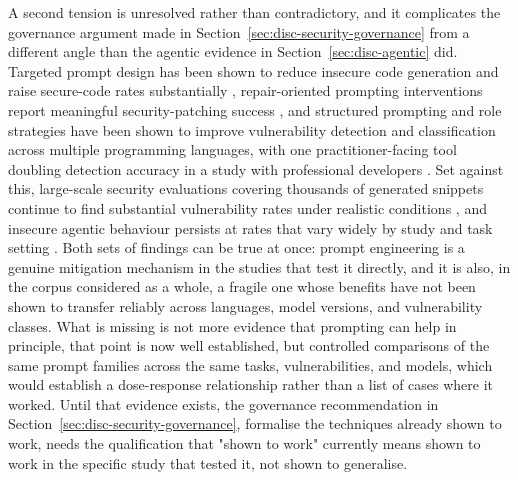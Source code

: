 A second tension is unresolved rather than contradictory, and it complicates the governance argument made in Section~\ref{sec:disc-security-governance} from a different angle than the agentic evidence in Section~\ref{sec:disc-agentic} did. Targeted prompt design has been shown to reduce insecure code generation and raise secure-code rates substantially \cite{res_enhancing_2024}, repair-oriented prompting interventions report meaningful security-patching success \cite{alrashedy_can_2024}, and structured prompting and role strategies have been shown to improve vulnerability detection and classification across multiple programming languages, with one practitioner-facing tool doubling detection accuracy in a study with professional developers \cite{dozono_large_2026}. Set against this, large-scale security evaluations covering thousands of generated snippets continue to find substantial vulnerability rates under realistic conditions \cite{siddiq_generate_2023,pearce_asleep_2025}, and insecure agentic behaviour persists at rates that vary widely by study and task setting \cite{kozak_when_2025}. Both sets of findings can be true at once: prompt engineering is a genuine mitigation mechanism in the studies that test it directly, and it is also, in the corpus considered as a whole, a fragile one whose benefits have not been shown to transfer reliably across languages, model versions, and vulnerability classes. What is missing is not more evidence that prompting can help in principle, that point is now well established, but controlled comparisons of the same prompt families across the same tasks, vulnerabilities, and models, which would establish a dose-response relationship rather than a list of cases where it worked. Until that evidence exists, the governance recommendation in Section~\ref{sec:disc-security-governance}, formalise the techniques already shown to work, needs the qualification that "shown to work" currently means shown to work in the specific study that tested it, not shown to generalise.

